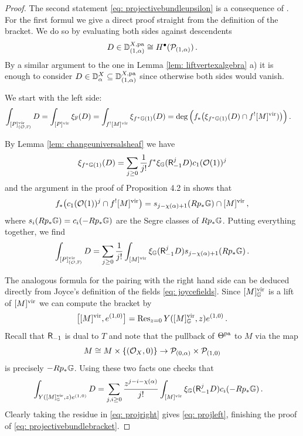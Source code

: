 \documentclass[a4paper, 12pt]{amsart}
\begin{document}
\begin{proof}
The second statement \eqref{eq: projectivebundleupsilon} is a consequence of \cite[Theorem 0.5 (2)]{park}. For the first formul we give a direct proof straight from the definition of the bracket. We do so by evaluating both sides against descendents \[D\in {\mathbb{D}}^{X, \mathop{\rm pa}\nolimits}_{(1, \alpha)}\cong H^\bullet({\mathcal P}_{(1,\alpha)})\,.\] By a similar argument to the one in Lemma \ref{lem: liftvertexalgebra} a) it is enough to consider $D\in {\mathbb{D}}^X_\alpha\subseteq {\mathbb{D}}^{X, \mathop{\rm pa}\nolimits}_{(1, \alpha)}$ since otherwise both sides would vanish. 

We start with the left side:
\begin{align}\nonumber
\int_{[P]^{\mathrm{vir}}_{({\mathcal O},{\mathbb{F}})}}D&=\int_{[P]^{\mathrm{vir}}}\xi_{{\mathbb{F}}}(D)=\int_{f^![M]^{\mathrm{vir}}}\xi_{f^\ast{\mathbb{G}}(1)}(D)=\deg\Big(f_\ast\big(\xi_{f^\ast {\mathbb{G}}(1)}(D)\cap f^![M]^{\mathrm{vir}})\big)\Big)\,.
\end{align}

By Lemma \ref{lem: changeuniversalsheaf} we have
\[\xi_{f^\ast {\mathbb{G}}(1)}(D)=\sum_{j\geq 0}\frac{1}{j!}f^\ast\xi_{{\mathbb{G}}}(\mathsf{R}_{-1}^j D)c_1({\mathcal O}(1))^j\]
and the argument in the proof of Proposition 4.2 in \cite{park} shows that
\[f_\ast\big(c_1({\mathcal O}(1))^j \cap f^![M]^{\mathrm{vir}}\big)=s_{j-\chi(\alpha)+1}(Rp_\ast{\mathbb{G}})\cap [M]^{\mathrm{vir}}\,,\]
where $s_{i}(Rp_\ast {\mathbb{G}})=c_i(-Rp_\ast {\mathbb{G}})$ are the Segre classes of $Rp_\ast {\mathbb{G}}$. Putting everything together, we find
\begin{equation} 
\label{eq: projleft}
\int_{[P]^{\mathrm{vir}}_{({\mathcal O},{\mathbb{F}})}}D=\sum_{j\geq 0}\frac{1}{j!} \int_{[M]^{\mathrm{vir}}} \xi_{{\mathbb{G}}}(\mathsf{R}_{-1}^jD)s_{j-\chi(\alpha)+1}(Rp_\ast {\mathbb{G}})\,.
\end{equation}


The analogous formula for the pairing with the right hand side can be deduced directly from Joyce's definition of the fields \eqref{eq: joycefields}. Since $[M]^{\mathrm{vir}}_{\mathbb{G}}$ is a lift of $[M]^{\mathrm{vir}}$ we can compute the bracket by
\[\big[[M]^\vir, e^{(1,0)}\big]=\Res_{z=0}Y([M]^\vir_\BG, z)e^{(1,0)}\,.\]
Recall that $\mathsf{R}_{-1}$ is dual to $T$ and note that the pullback of $\Theta^{\mathop{\rm pa}\nolimits}$ to $M$ via the map 
\[M\cong  M\times \{({\mathcal O}_X, 0)\}\to {\mathcal P}_{(0,\alpha)}\times {\mathcal P}_{(1,0)}\]
is precisely $-Rp_\ast {\mathbb{G}}$. Using these two facts one checks that
\begin{align}\label{eq: projright}
\int_{Y([M]^{\mathrm{vir}}_{\mathbb{G}}, z)e^{(1,0)}}D&=\sum_{j,i\geq 0}\frac{z^{j-i-\chi(\alpha)}}{j!} \int_{[M]^{\mathrm{vir}}} \xi_{{\mathbb{G}}}(\mathsf{R}_{-1}^jD)c_{i}(-Rp_\ast {\mathbb{G}})\,.
\end{align}
Clearly taking the residue in \eqref{eq: projright} gives \eqref{eq: projleft}, finishing the proof of \eqref{eq: projectivebundlebracket}.
\end{proof}
\end{document}
